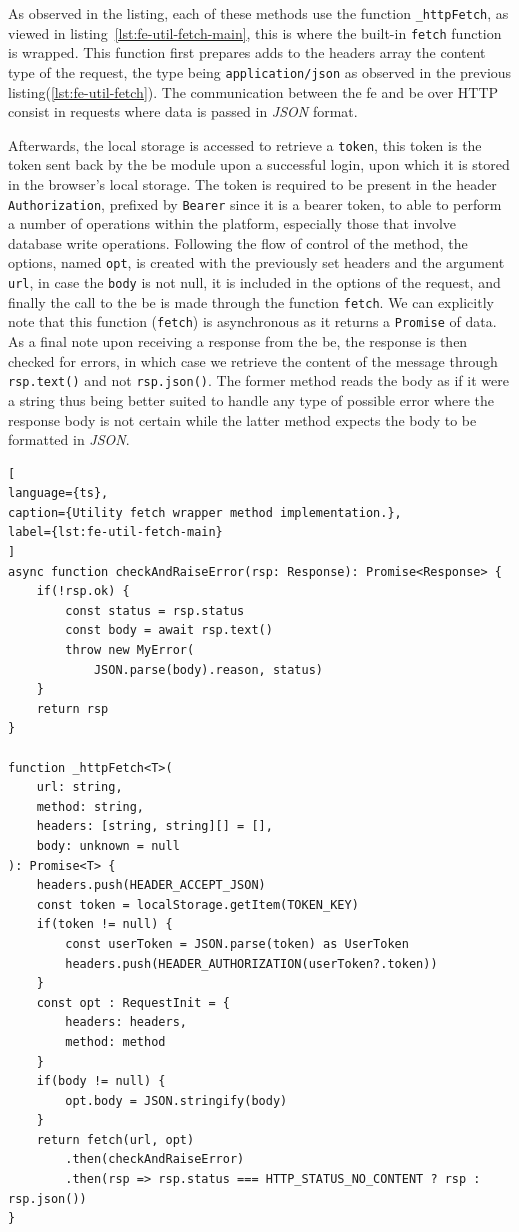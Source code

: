 As observed in the listing, each of these methods use the function \lstinline{_httpFetch}, as viewed in listing~\ref{lst:fe-util-fetch-main}, this is where the built-in \lstinline{fetch} function is wrapped. This function first prepares adds to the headers array the content type of the request, the type being \lstinline{application/json} as observed in the previous listing(\ref{lst:fe-util-fetch}). The communication between the \acrshort{fe} and \acrshort{be} over HTTP consist in requests where data is passed in \textit{JSON} format.

Afterwards, the local storage is accessed to retrieve a \lstinline{token}, this token is the token sent back by the \acrshort{be} module upon a successful login, upon which it is stored in the browser's local storage.
The token is required to be present in the header \lstinline{Authorization}, prefixed by \lstinline{Bearer} since it is a bearer token, to able to perform a number of operations within the platform, especially those that involve database write operations. Following the flow of control of the method, the options, named \lstinline{opt}, is created with the previously set headers and the argument \lstinline{url}, in case the \lstinline{body} is not null, it is included in the options of the request, and finally the call to the \acrshort{be} is made through the function \lstinline{fetch}. We can explicitly note that this function (\lstinline{fetch}) is asynchronous as it returns a \lstinline{Promise} of data. As a final note upon receiving a response from the \acrshort{be}, the response is then checked for errors, in which case we retrieve the content of the message through \lstinline{rsp.text()} and not \lstinline{rsp.json()}. The former method reads the body as if it were a string thus being better suited to handle any type of possible error where the response body is not certain while the latter method expects the body to be formatted in \textit{JSON}.


\begin{lstlisting}[
language={ts},
caption={Utility fetch wrapper method implementation.},
label={lst:fe-util-fetch-main}
]
async function checkAndRaiseError(rsp: Response): Promise<Response> {
    if(!rsp.ok) {
        const status = rsp.status
        const body = await rsp.text()
        throw new MyError(
            JSON.parse(body).reason, status)
    }
    return rsp
}

function _httpFetch<T>(
    url: string,
    method: string,
    headers: [string, string][] = [],
    body: unknown = null
): Promise<T> {
    headers.push(HEADER_ACCEPT_JSON)
    const token = localStorage.getItem(TOKEN_KEY)
    if(token != null) {
        const userToken = JSON.parse(token) as UserToken
        headers.push(HEADER_AUTHORIZATION(userToken?.token))
    }
    const opt : RequestInit = {
        headers: headers,
        method: method
    }
    if(body != null) {
        opt.body = JSON.stringify(body)
    }
    return fetch(url, opt)
        .then(checkAndRaiseError)
        .then(rsp => rsp.status === HTTP_STATUS_NO_CONTENT ? rsp : rsp.json())
}
\end{lstlisting}


